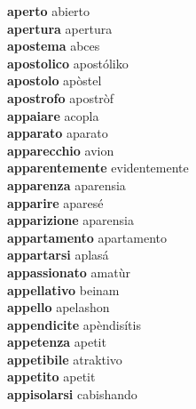 \textbf{aperto } abierto \\
\textbf{apertura } apertura \\
\textbf{apostema } abces \\
\textbf{apostolico } apostóliko \\
\textbf{apostolo } apòstel \\
\textbf{apostrofo } apostròf \\
\textbf{appaiare } acopla \\
\textbf{apparato } aparato \\
\textbf{apparecchio } avion \\
\textbf{apparentemente } evidentemente \\
\textbf{apparenza } aparensia \\
\textbf{apparire } aparesé \\
\textbf{apparizione } aparensia \\
\textbf{appartamento } apartamento \\
\textbf{appartarsi } aplasá \\
\textbf{appassionato } amatùr \\
\textbf{appellativo } beinam \\
\textbf{appello } apelashon \\
\textbf{appendicite } apèndisítis \\
\textbf{appetenza } apetit \\
\textbf{appetibile } atraktivo \\
\textbf{appetito } apetit \\
\textbf{appisolarsi } cabishando \\
